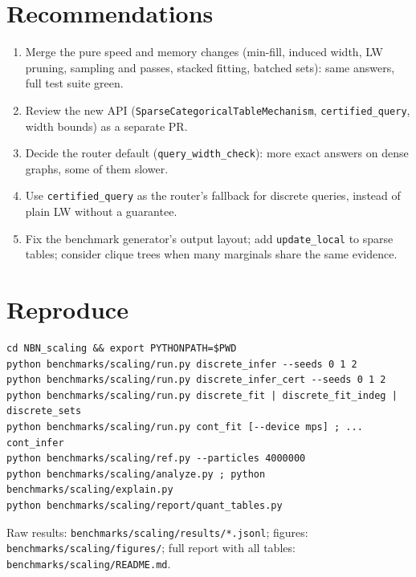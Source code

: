 \documentclass[10pt,a4paper]{article}
\newcommand{\code}[1]{\texttt{#1}}
\begin{document}
\section{Recommendations}
\begin{enumerate}
  \item Merge the pure speed and memory changes (min-fill, induced width, LW pruning, sampling and
  passes, stacked fitting, batched sets): same answers, full test suite green.
  \item Review the new API (\code{SparseCategoricalTableMechanism}, \code{certified\_query}, width
  bounds) as a separate PR.
  \item Decide the router default (\code{query\_width\_check}): more exact answers on dense graphs,
  some of them slower.
  \item Use \code{certified\_query} as the router's fallback for discrete queries, instead of plain
  LW without a guarantee.
  \item Fix the benchmark generator's output layout; add \code{update\_local} to sparse tables;
  consider clique trees when many marginals share the same evidence.
\end{enumerate}

\appendix
\section{Reproduce}
\begin{verbatim}
cd NBN_scaling && export PYTHONPATH=$PWD
python benchmarks/scaling/run.py discrete_infer --seeds 0 1 2
python benchmarks/scaling/run.py discrete_infer_cert --seeds 0 1 2
python benchmarks/scaling/run.py discrete_fit | discrete_fit_indeg | discrete_sets
python benchmarks/scaling/run.py cont_fit [--device mps] ; ... cont_infer
python benchmarks/scaling/ref.py --particles 4000000
python benchmarks/scaling/analyze.py ; python benchmarks/scaling/explain.py
python benchmarks/scaling/report/quant_tables.py
\end{verbatim}
Raw results: \code{benchmarks/scaling/results/*.jsonl}; figures: \code{benchmarks/scaling/figures/};
full report with all tables: \code{benchmarks/scaling/README.md}.
\end{document}

